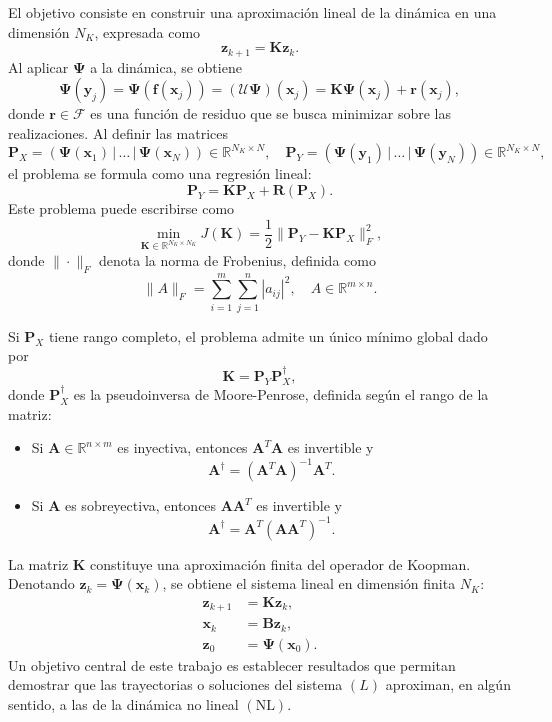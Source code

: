 El objetivo consiste en construir una aproximación lineal de la dinámica en una dimensión $N_K$, expresada como  
\[
\mathbf{z}_{k+1} = \mathbf{K} \mathbf{z}_k.
\]
Al aplicar $\mathbf{\Psi}$ a la dinámica, se obtiene  
\[
\mathbf{\Psi}(\mathbf{y}_j) = \mathbf{\Psi}(\mathbf{f}(\mathbf{x}_j)) = (\mathcal{U}\mathbf{\Psi})(\mathbf{x}_j) = \mathbf{K} \mathbf{\Psi}(\mathbf{x}_j) + \mathbf{r}(\mathbf{x}_j),
\]
donde $\mathbf{r} \in \mathcal{F}$ es una función de residuo que se busca minimizar sobre las realizaciones. Al definir las matrices  
\[
\mathbf{P}_X = (\mathbf{\Psi}(\mathbf{x}_1) \,|\, \dots \,|\, \mathbf{\Psi}(\mathbf{x}_N)) \in \mathbb{R}^{N_K \times N}, \quad \mathbf{P}_Y = (\mathbf{\Psi}(\mathbf{y}_1) \,|\, \dots \,|\, \mathbf{\Psi}(\mathbf{y}_N)) \in \mathbb{R}^{N_K \times N},
\]
el problema se formula como una regresión lineal:
\[
\mathbf{P}_Y = \mathbf{K} \mathbf{P}_X + \mathbf{R}(\mathbf{P}_X).
\]
Este problema puede escribirse como  
\[
\min_{\mathbf{K} \in \mathbb{R}^{N_K \times N_K}} J(\mathbf{K}) = \frac{1}{2} \|\mathbf{P}_Y - \mathbf{K} \mathbf{P}_X\|_F^2,
\]
donde $\|\cdot\|_F$ denota la norma de Frobenius, definida como  
\[
\|A\|_F = \sum_{i=1}^m \sum_{j=1}^n |a_{ij}|^2, \quad A \in \mathbb{R}^{m \times n}.
\]

Si $\mathbf{P}_X$ tiene rango completo, el problema admite un único mínimo global dado por  
\[
\mathbf{K} = \mathbf{P}_Y \mathbf{P}_X^\dagger,
\]
donde $\mathbf{P}_X^\dagger$ es la pseudoinversa de Moore-Penrose, definida según el rango de la matriz:
\begin{itemize}
    \item Si $\mathbf{A} \in \mathbb{R}^{n \times m}$ es inyectiva, entonces $\mathbf{A}^T \mathbf{A}$ es invertible y  
    \[
    \mathbf{A}^\dagger = (\mathbf{A}^T \mathbf{A})^{-1} \mathbf{A}^T.
    \]
    \item Si $\mathbf{A}$ es sobreyectiva, entonces $\mathbf{A} \mathbf{A}^T$ es invertible y  
    \[
    \mathbf{A}^\dagger = \mathbf{A}^T (\mathbf{A} \mathbf{A}^T)^{-1}.
    \]
\end{itemize}

La matriz $\mathbf{K}$ constituye una aproximación finita del operador de Koopman. Denotando $\mathbf{z}_k = \mathbf{\Psi}(\mathbf{x}_k)$, se obtiene el sistema lineal en dimensión finita $N_K$:  
\[
\begin{aligned}
\mathbf{z}_{k+1} &= \mathbf{K} \mathbf{z}_k, \\
\mathbf{x}_k &= \mathbf{B} \mathbf{z}_k, \\ 
\mathbf{z}_0 &= \mathbf{\Psi}(\mathbf{x}_0).
\end{aligned}
\tag{\(L\)}
\]
Un objetivo central de este trabajo es establecer resultados que permitan demostrar que las trayectorias o soluciones del sistema \((L)\) aproximan, en algún sentido, a las de la dinámica no lineal \((\text{NL})\).

